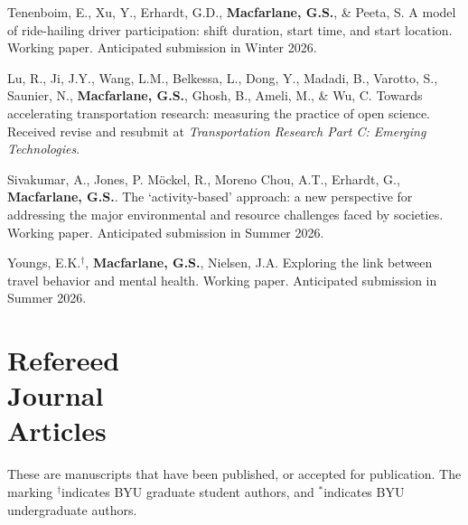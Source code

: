 \documentclass[margin,line]{res}
\newif\ifdetail{}
\newcounter{enuminitialize}
\newenvironment{myenum}[1][]
{%
 \setcounter{enuminitialize}{#1}
 \addtocounter{enuminitialize}{2}
 \begin{enumerate}[left= 4pt, itemsep=8pt, start=\value{enuminitialize}, label=\arabic*\addtocounter{enumi}{-2}]
}
{%
 \end{enumerate}
}
\begin{document}
\begin{resume}
\begin{myenum}[7]
{  \item Tenenboim, E., Xu, Y., Erhardt, G.D.,  \textbf{Macfarlane, G.S.}, \&
  Peeta, S.  A model of ride-hailing driver participation: shift duration, start
  time, and start location. Working paper. Anticipated submission in Winter 2026.


  \item Lu, R., Ji, J.Y., Wang, L.M., Belkessa, L., Dong, Y., Madadi, B.,
  Varotto, S., Saunier, N., \textbf{Macfarlane, G.S.}, Ghosh, B., Ameli, M., \&
  Wu, C. Towards accelerating transportation research: measuring the practice of
  open science. Received revise and resubmit at \textit{Transportation Research Part C: Emerging Technologies}. 

  \item Sivakumar, A., Jones, P. M\"ockel, R., Moreno Chou, A.T., Erhardt, G.,
  \textbf{Macfarlane, G.S.}. The ‘activity-based’ approach: a new
  perspective for addressing the major environmental and resource challenges
  faced by societies. Working paper. Anticipated submission in Summer 2026.

  \item Youngs, E.K.$^\dagger$, \textbf{Macfarlane, G.S.}, Nielsen, J.A.
  Exploring the link between travel behavior and mental health. Working paper.
  Anticipated submission in Summer 2026.


}

\end{myenum}
 \fi

\section{Refereed \\ Journal\\ Articles}
These are manuscripts that have been published, or accepted for publication.
The marking $^\dagger$indicates BYU graduate student authors, and $^*$indicates
BYU undergraduate authors. 

\ifdetail 
First author or first faculty author on 12 of 21  total journal articles, indicating primary responsibility for the work.
Paper 1 came from my undergraduate work, papers 2 through 6 were from my doctoral research, and
papers 7 onward represent work completed during my time on the faculty at BYU. Number of citations
are from Google Scholar as of August 2025.  
For recent papers, I provide a short description of my role in the work.
Notes on the venues where I publish including impact factors and rankings are provided 
in the section following. 
\fi
\vspace{.3cm}


\end{resume}
\end{document}
